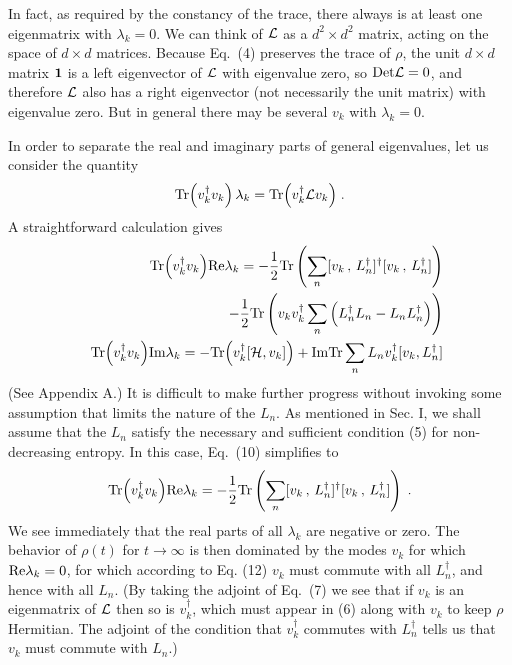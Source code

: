 \documentclass[12pt]{article}
\def\BM#1{\mbox{\boldmath{$#1$}}}
\begin{document}
In fact, as required by the constancy of the trace, there always is at least one eigenmatrix with $\lambda_k=0$.  We can think of ${\cal L}$ as a $d^2\times d^2$ matrix, acting on the space of $d\times d$ matrices.  Because Eq.~(4) preserves the trace of $\rho$, the unit $d\times d$ matrix ${\BM 1}$ is a left eigenvector of ${\cal L}$ with eigenvalue zero, so ${\rm Det}{\cal L}=0$, and therefore ${\cal L}$ also has a right eigenvector (not necessarily the unit matrix) with eigenvalue zero.  But in general there may be several  $v_k$ with $\lambda_k=0$.

In order to separate the real and imaginary parts of general eigenvalues, let us consider the quantity
\begin{equation}
{\rm Tr}\Big(v_k^\dagger v_k\Big)\,\lambda_k= {\rm Tr}\Big(v_k^\dagger {\cal L}v_k\Big)\;.
\end{equation}
A straightforward calculation gives
\begin{eqnarray}
&&{\rm Tr}\Big(v_k^\dagger v_k\Big){\rm Re}\lambda_k=-\frac{1}{2}{\rm Tr}\left(\sum_n [v_k\,,\,L_n^\dagger]^\dagger[v_k\,,\,L_n^\dagger]\right)\nonumber\\&&
~~~~~-\frac{1}{2}{\rm Tr}\left(v_k v_k^\dagger \sum_n\Big(L_n^\dagger L_n-L_n L_n^\dagger\Big)\right)\\
&&{\rm Tr}\Big(v_k^\dagger v_k\Big){\rm Im}\lambda_k=-{\rm Tr}\Big(v_k^\dagger [{\cal H},v_k]\Big)
+{\rm Im}{\rm Tr}\sum_n L_nv_k^\dagger[v_k,L_n^\dagger ]\end{eqnarray}
(See Appendix A.)  
It is difficult to make further progress without invoking some assumption that limits the nature of the $L_n$.  As mentioned in Sec. I, we shall assume that the $L_n$ satisfy the necessary and sufficient condition (5) for non-decreasing entropy.  In this case, Eq.~(10) simplifies to 
\begin{equation}
{\rm Tr}\Big(v_k^\dagger v_k\Big){\rm Re}\lambda_k=-\frac{1}{2}{\rm Tr}\left(\sum_n [v_k\,,\,L_n^\dagger]^\dagger[v_k\,,\,L_n^\dagger]\right)\;.
\end{equation}
We see immediately that  the real parts of all $\lambda_k$ are negative or zero.  The behavior of $\rho(t)$ for $t\rightarrow\infty$ is then dominated by the modes $v_k$ for which ${\rm Re}\lambda_k=0$, for which according to Eq. (12) $v_k$ must commute with all $L^\dagger_n$, and hence with all $L_n$.  (By taking the adjoint of Eq.~(7) we see that if $v_k$ is an eigenmatrix of ${\cal L}$ then so is $v_k^\dagger$, which must appear in (6) along with $v_k$ to keep $\rho$ Hermitian.  The adjoint of the condition that $v_k^\dagger$ commutes with $L_n^\dagger$ tells us that $v_k$ must commute with $L_n$.)  
\end{document}

